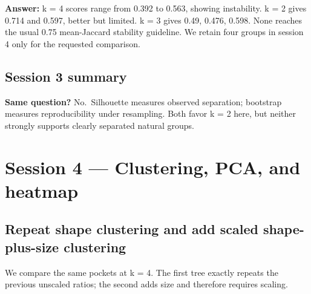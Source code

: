 \documentclass[
  10pt,
]{article}
\begin{document}
\textbf{Answer:} k = 4 scores range from 0.392 to 0.563, showing
instability. k = 2 gives 0.714 and 0.597, better but limited. k = 3
gives 0.49, 0.476, 0.598. None reaches the usual 0.75 mean-Jaccard
stability guideline. We retain four groups in session 4 only for the
requested comparison.

\subsection{Session 3 summary}\label{session-3-summary}

\textbf{Same question?} No.~Silhouette measures observed separation;
bootstrap measures reproducibility under resampling. Both favor k = 2
here, but neither strongly supports clearly separated natural groups.

\section{Session 4 --- Clustering, PCA, and
heatmap}\label{session-4-clustering-pca-and-heatmap}

\subsection{Repeat shape clustering and add scaled shape-plus-size
clustering}\label{repeat-shape-clustering-and-add-scaled-shape-plus-size-clustering}

We compare the same pockets at k = 4. The first tree exactly repeats the
previous unscaled ratios; the second adds size and therefore requires
scaling.
\end{document}
